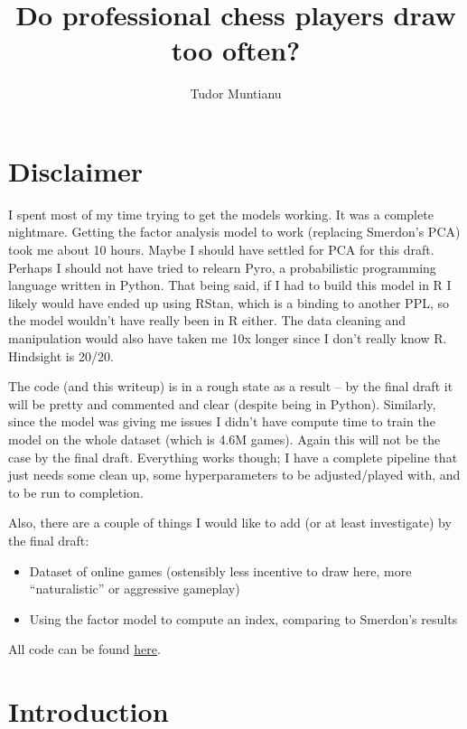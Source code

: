 \documentclass{article}
\begin{document}
\title{Do professional chess players draw too often?}
\author{Tudor Muntianu}
\maketitle

\section*{Disclaimer}
I spent most of my time trying to get the models working. It was a complete nightmare. Getting the factor analysis model to work (replacing Smerdon's PCA) took me about 10 hours.
Maybe I should have settled for PCA for this draft.
Perhaps I should not have tried to relearn Pyro, a probabilistic programming language written in Python.
That being said, if I had to build this model in R I likely would have ended up using RStan, which is a binding to another PPL, so the model wouldn't have really been in R either.
The data cleaning and manipulation would also have taken me 10x longer since I don't really know R.
Hindsight is 20/20.

The code (and this writeup) is in a rough state as a result -- by the final draft it will be pretty and commented and clear (despite being in Python).
Similarly, since the model was giving me issues I didn't have compute time to train the model on the whole dataset (which is 4.6M games).
Again this will not be the case by the final draft. Everything works though; I have a complete pipeline
that just needs some clean up, some hyperparameters to be adjusted/played with, and to be run to completion.

Also, there are a couple of things I would like to add (or at least investigate) by the final draft:
\begin{itemize}
    \item Dataset of online games (ostensibly less incentive to draw here, more ``naturalistic'' or aggressive gameplay)
    \item Using the factor model to compute an index, comparing to Smerdon's results
\end{itemize}

All code can be found \href{https://github.com/tmuntianu/chessdraws}{here}.

\section{Introduction}
\end{document}
